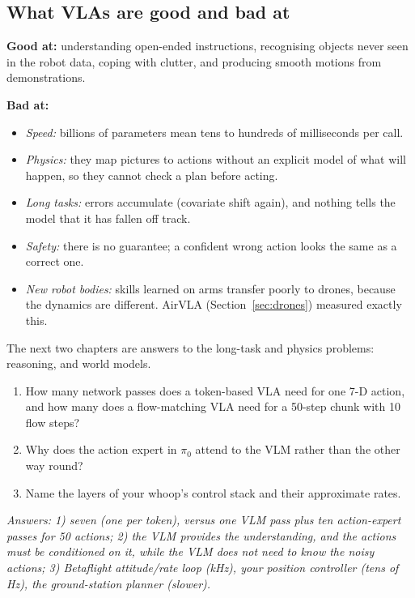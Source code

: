 \subsection{What VLAs are good and bad at}
\textbf{Good at:} understanding open-ended instructions, recognising objects never seen in the robot data, coping with clutter, and producing smooth motions from demonstrations.

\textbf{Bad at:}
\begin{itemize}
\item \emph{Speed:} billions of parameters mean tens to hundreds of milliseconds per call.
\item \emph{Physics:} they map pictures to actions without an explicit model of what will happen, so they cannot check a plan before acting.
\item \emph{Long tasks:} errors accumulate (covariate shift again), and nothing tells the model that it has fallen off track.
\item \emph{Safety:} there is no guarantee; a confident wrong action looks the same as a correct one.
\item \emph{New robot bodies:} skills learned on arms transfer poorly to drones, because the dynamics are different. AirVLA (Section~\ref{sec:drones}) measured exactly this.
\end{itemize}
The next two chapters are answers to the long-task and physics problems: reasoning, and world models.

\begin{quizbox}
\begin{enumerate}[leftmargin=*]
\item How many network passes does a token-based VLA need for one 7-D action, and how many does a flow-matching VLA need for a 50-step chunk with 10 flow steps?
\item Why does the action expert in $\pi_0$ attend to the VLM rather than the other way round?
\item Name the layers of your whoop's control stack and their approximate rates.
\end{enumerate}
\emph{Answers: 1) seven (one per token), versus one VLM pass plus ten action-expert passes for 50 actions; 2) the VLM provides the understanding, and the actions must be conditioned on it, while the VLM does not need to know the noisy actions; 3) Betaflight attitude/rate loop (kHz), your position controller (tens of Hz), the ground-station planner (slower).}
\end{quizbox}

